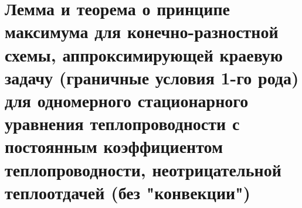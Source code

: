 \documentclass[__main__.tex]{subfiles}
\begin{document}
\section{Лемма и теорема о принципе максимума для конечно-разностной схемы, аппроксимирующей краевую задачу (граничные условия 1-го рода) для одномерного стационарного уравнения теплопроводности с постоянным коэффициентом теплопроводности, неотрицательной теплоотдачей (без "конвекции")}
\end{document}
